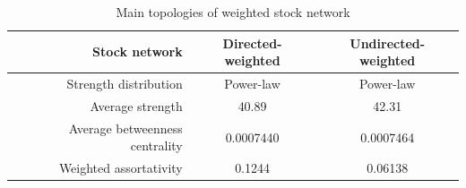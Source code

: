 \begin{table}
	\begin{center}
		\begin{tabular}{r|c|c}\hline\hline
			Stock network&Directed-weighted&Undirected-weighted\\\hline
			Strength distribution & Power-law & Power-law\\
			Average strength & 40.89 & 42.31\\ %
			Average betweenness centrality & 0.0007440 & 0.0007464\\
			Weighted assortativity & 0.1244 & 0.06138\\ %
			\hline\hline
		\end{tabular}
	\end{center}
	\caption{Main topologies of weighted stock network}\label{tab:weighted}
	\label{fig:topology_weighted}
\end{table}

